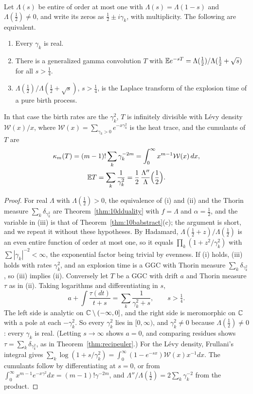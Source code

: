 \begin{theorem}\label{thm:hitexplosion}
Let $\Lambda(s)$ be entire of order at most one with $\Lambda(s)=\Lambda(1-s)$ and $\Lambda(\frac12)\ne0$, and write its zeros as $\frac12\pm i\gamma_k$, with multiplicity. The following are equivalent.
\begin{enumerate}
\item[(i)] Every $\gamma_k$ is real.
\item[(ii)] There is a generalized gamma convolution $T$ with $\mathbb{E} e^{-sT}=\Lambda(\frac12)/\Lambda(\frac12+\sqrt s)$ for all $s>\frac14$.
\item[(iii)] $\Lambda(\frac12)/\Lambda(\frac12+\sqrt s)$, $s>\frac14$, is the Laplace transform of the explosion time of a pure birth process.
\end{enumerate}
In that case the birth rates are the $\gamma_k^2$, $T$ is infinitely divisible with L\'evy density $\mathcal W(x)/x$, where $\mathcal W(x)=\sum_{\gamma_k>0}e^{-x\gamma_k^2}$ is the heat trace, and the cumulants of $T$ are
\[
\begin{gathered}
\kappa_m(T)=(m-1)!\sum_k\gamma_k^{-2m}=\int_0^\infty x^{m-1}\mathcal W(x)\,dx,\\
\mathbb{E} T=\sum_k\frac1{\gamma_k^2}=\frac12\,\frac{\Lambda''}{\Lambda}\Bigl(\frac12\Bigr).
\end{gathered}
\]
\end{theorem}

\begin{proof}
For real $\Lambda$ with $\Lambda(\frac12)>0$, the equivalence of (i) and (ii) and the Thorin measure $\sum_k\delta_{\gamma_k^2}$ are Theorem~\ref{thm:10dduality} with $f=\Lambda$ and $\alpha=\frac12$, and the variable in (iii) is that of Theorem~\ref{thm:10babstract}(c); the argument is short, and we repeat it without these hypotheses. By Hadamard, $\Lambda(\frac12+z)/\Lambda(\frac12)$ is an even entire function of order at most one, so it equals $\prod_k(1+z^2/\gamma_k^2)$ with $\sum|\gamma_k|^{-2}<\infty$, the exponential factor being trivial by evenness. If (i) holds, (iii) holds with rates $\gamma_k^2$, and an explosion time is a GGC with Thorin measure $\sum_k\delta_{\gamma_k^2}$, so (iii) implies (ii). Conversely let $T$ be a GGC with drift $a$ and Thorin measure $\tau$ as in (ii). Taking logarithms and differentiating in $s$,
\[
a+\int\frac{\tau(dt)}{t+s}=\sum_k\frac1{\gamma_k^2+s},\qquad s>\tfrac14 .
\]
The left side is analytic on $\mathbb{C}\setminus(-\infty,0]$, and the right side is meromorphic on $\mathbb{C}$ with a pole at each $-\gamma_k^2$. So every $\gamma_k^2$ lies in $[0,\infty)$, and $\gamma_k^2\ne0$ because $\Lambda(\frac12)\ne0$: every $\gamma_k$ is real. (Letting $s\to\infty$ shows $a=0$, and comparing residues shows $\tau=\sum_k\delta_{\gamma_k^2}$, as in Theorem~\ref{thm:recipeuler}.) For the L\'evy density, Frullani's integral gives $\sum_k\log(1+s/\gamma_k^2)=\int_0^\infty(1-e^{-sx})\mathcal W(x)x^{-1}dx$. The cumulants follow by differentiating at $s=0$, or from $\int_0^\infty x^{m-1}e^{-x\gamma^2}dx=(m-1)!\gamma^{-2m}$, and $\Lambda''/\Lambda(\frac12)=2\sum_k\gamma_k^{-2}$ from the product.
\end{proof}

